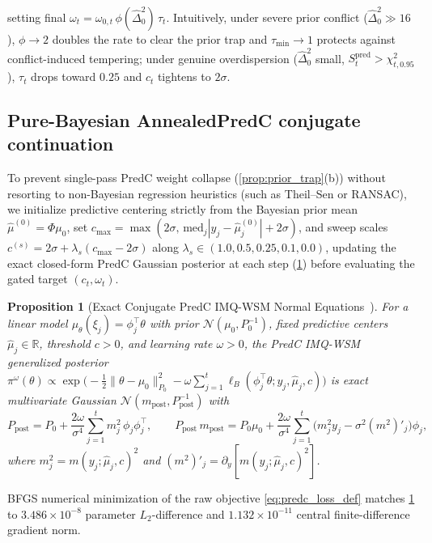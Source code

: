\documentclass[11pt,a4paper,reqno]{amsart}
\newtheorem{proposition}[theorem]{Proposition}
\theoremstyle{definition}
\theoremstyle{remark}
\newcommand{\R}{\mathbb{R}}
\newcommand{\Ncal}{\mathcal{N}}
\begin{document}
setting final $\omega_t = \omega_{0,t}\,\phi(\hat{\Delta}_0^2)\,\tau_t$. Intuitively, under severe prior conflict ($\hat{\Delta}_0^2 \gg 16$), $\phi \to 2$ doubles the rate to clear the prior trap and $\tau_{\min} \to 1$ protects against conflict-induced tempering; under genuine overdispersion ($\hat{\Delta}_0^2$ small, $S_t^{\mathrm{pred}} > \chi^2_{t, 0.95}$), $\tau_t$ drops toward $0.25$ and $c_t$ tightens to $2\sigma$.

\subsection{Pure-Bayesian AnnealedPredC conjugate continuation}
To prevent single-pass PredC weight collapse (\cref{prop:prior_trap}(b)) without resorting to non-Bayesian regression heuristics (such as Theil--Sen or RANSAC), we initialize predictive centering strictly from the Bayesian prior mean $\hat{\mu}^{(0)} = \Phi \mu_0$, set $c_{\max} = \max(2\sigma,\, \mathrm{med}_j |y_j - \hat{\mu}^{(0)}_j| + 2\sigma)$, and sweep scales $c^{(s)} = 2\sigma + \lambda_s(c_{\max} - 2\sigma)$ along $\lambda_s \in (1.0, 0.5, 0.25, 0.1, 0.0)$, updating the exact closed-form PredC Gaussian posterior at each step (\cref{prop:conjugate_predc}) before evaluating the gated target $(c_t, \omega_t)$.

\begin{proposition}[Exact Conjugate PredC IMQ-WSM Normal Equations~\cite{altamirano2024rcgp}]\label{prop:conjugate_predc}
For a linear model $\mu_\theta(\xi_j) = \phi_j^\top \theta$ with prior $\Ncal(\mu_0, P_0^{-1})$, fixed predictive centers $\hat{\mu}_j \in \R$, threshold $c > 0$, and learning rate $\omega > 0$, the PredC IMQ-WSM generalized posterior $\pi^{\omega}(\theta) \propto \exp\bigl(-\frac{1}{2}\|\theta - \mu_0\|_{P_0}^2 - \omega \sum_{j=1}^t \ell_B(\phi_j^\top\theta; y_j, \hat{\mu}_j, c)\bigr)$ is exact multivariate Gaussian $\Ncal(m_{\mathrm{post}}, P_{\mathrm{post}}^{-1})$ with
\[
P_{\mathrm{post}} = P_0 + \frac{2\omega}{\sigma^4}\sum_{j=1}^t m_j^2\,\phi_j \phi_j^\top, \qquad
P_{\mathrm{post}}\,m_{\mathrm{post}} = P_0 \mu_0 + \frac{2\omega}{\sigma^4}\sum_{j=1}^t \bigl(m_j^2 y_j - \sigma^2 (m^2)'_j\bigr)\phi_j,
\]
where $m_j^2 = m(y_j; \hat{\mu}_j, c)^2$ and $(m^2)'_j = \partial_y [m(y_j; \hat{\mu}_j, c)^2]$.
\end{proposition}

BFGS numerical minimization of the raw objective \eqref{eq:predc_loss_def} matches \cref{prop:conjugate_predc} to $3.486 \times 10^{-8}$ parameter $L_2$-difference and $1.132 \times 10^{-11}$ central finite-difference gradient norm.
\end{document}
